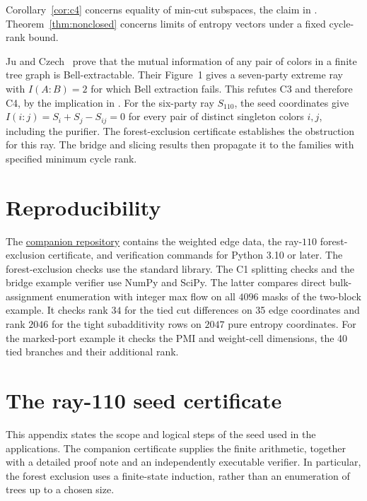 \documentclass[11pt]{article}
\newcommand{\ray}{S_{110}}
\begin{document}
Corollary~\ref{cor:c4} concerns equality of min-cut subspaces, the
claim in \cite[Eq.~(6.11)]{hhr2022}. Theorem~\ref{thm:nonclosed}
concerns limits of entropy vectors under a fixed cycle-rank bound.

Ju and Czech~\cite[Secs.~IV--V and App.~A]{juczech2026} prove that the
mutual information of any pair of colors in a finite tree graph is
Bell-extractable. Their Figure~1 gives a seven-party extreme ray with
\(I(A:B)=2\) for which Bell extraction fails. This refutes C3 and
therefore C4, by the implication in \cite[Sec.~6.2]{hhr2022}.
For the six-party ray \(\ray\), the seed coordinates give
\(I(i:j)=S_i+S_j-S_{ij}=0\) for every pair of distinct singleton colors
\(i,j\), including the purifier. The forest-exclusion certificate
establishes the obstruction for this ray. The bridge and slicing
results then propagate it to the families with specified minimum
cycle rank.

\section*{Reproducibility}

The \href{https://github.com/LeoLam233/holographic-entropy-bridges}
{companion repository} contains the weighted edge data, the ray-\(110\)
forest-exclusion certificate, and verification commands for Python
3.10 or later. The forest-exclusion checks use the standard library.
The C1 splitting checks and the bridge example verifier use NumPy and
SciPy. The latter compares direct bulk-assignment enumeration with
integer max flow on all \(4096\) masks of the two-block example. It
checks rank \(34\) for the tied cut differences on 35 edge coordinates
and rank \(2046\) for the tight subadditivity rows on \(2047\) pure
entropy coordinates. For the marked-port example it checks the PMI and
weight-cell dimensions, the 40 tied branches and their additional rank.

\appendix
\section{The ray-110 seed certificate}
\label{app:seed}

This appendix states the scope and logical steps of the seed used in
the applications. The companion certificate supplies the finite
arithmetic, together with a detailed proof note and an independently
executable verifier. In particular, the forest exclusion uses a
finite-state induction, rather than an enumeration of trees up to a
chosen size.
\end{document}
